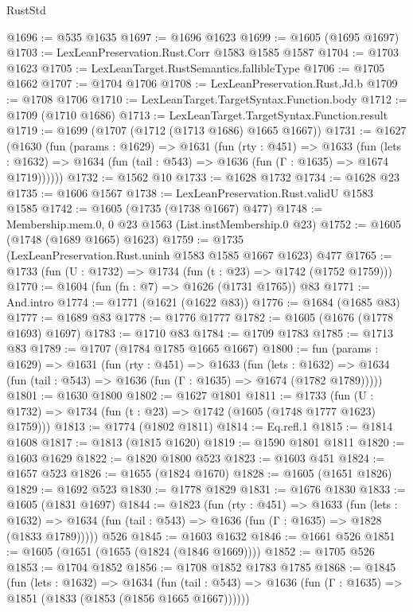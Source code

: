 \begin{lexlean}{RustStd}
\begin{coremodule}
@1696 := @535 @1635
@1697 := @1696 @1623
@1699 := @1605 (@1695 @1697)
@1703 := LexLeanPreservation.Rust.Corr @1583 @1585 @1587
@1704 := @1703 @1623
@1705 := LexLeanTarget.RustSemantics.fallibleType
@1706 := @1705 @1662
@1707 := @1704 @1706
@1708 := LexLeanPreservation.Rust.Jd.b
@1709 := @1708 @1706
@1710 := LexLeanTarget.TargetSyntax.Function.body
@1712 := @1709 (@1710 @1686)
@1713 := LexLeanTarget.TargetSyntax.Function.result
@1719 := @1699 (@1707 (@1712 (@1713 @1686) @1665 @1667))
@1731 := @1627
    (@1630
      (fun (params : @1629) =>
      @1631
        (fun (rty : @451) =>
        @1633
          (fun (lets : @1632) =>
          @1634 (fun (tail : @543) => @1636 (fun (Γ : @1635) => @1674 @1719))))))
@1732 := @1562 @10
@1733 := @1628 @1732
@1734 := @1628 @23
@1735 := @1606 @1567
@1738 := LexLeanPreservation.Rust.validU @1583 @1585
@1742 := @1605 (@1735 (@1738 @1667) @477)
@1748 := Membership.mem.{0, 0} @23 @1563 (List.instMembership.{0} @23)
@1752 := @1605 (@1748 (@1689 @1665) @1623)
@1759 := @1735 (LexLeanPreservation.Rust.uninh @1583 @1585 @1667 @1623) @477
@1765 := @1733 (fun (U : @1732) => @1734 (fun (t : @23) => @1742 (@1752 @1759)))
@1770 := @1604 (fun (fn : @7) => @1626 (@1731 @1765)) @83
@1771 := And.intro
@1774 := @1771 (@1621 (@1622 @83))
@1776 := @1684 (@1685 @83)
@1777 := @1689 @83
@1778 := @1776 @1777
@1782 := @1605 (@1676 (@1778 @1693) @1697)
@1783 := @1710 @83
@1784 := @1709 @1783
@1785 := @1713 @83
@1789 := @1707 (@1784 @1785 @1665 @1667)
@1800 := fun (params : @1629) =>
  @1631
    (fun (rty : @451) =>
    @1633
      (fun (lets : @1632) =>
      @1634 (fun (tail : @543) => @1636 (fun (Γ : @1635) => @1674 (@1782 @1789)))))
@1801 := @1630 @1800
@1802 := @1627 @1801
@1811 := @1733 (fun (U : @1732) => @1734 (fun (t : @23) => @1742 (@1605 (@1748 @1777 @1623) @1759)))
@1813 := @1774 (@1802 @1811)
@1814 := Eq.refl.{1}
@1815 := @1814 @1608
@1817 := @1813 (@1815 @1620)
@1819 := @1590 @1801 @1811
@1820 := @1603 @1629
@1822 := @1820 @1800 @523
@1823 := @1603 @451
@1824 := @1657 @523
@1826 := @1655 (@1824 @1670)
@1828 := @1605 (@1651 @1826)
@1829 := @1692 @523
@1830 := @1778 @1829
@1831 := @1676 @1830
@1833 := @1605 (@1831 @1697)
@1844 := @1823
    (fun (rty : @451) =>
    @1633
      (fun (lets : @1632) =>
      @1634 (fun (tail : @543) => @1636 (fun (Γ : @1635) => @1828 (@1833 @1789)))))
    @526
@1845 := @1603 @1632
@1846 := @1661 @526
@1851 := @1605 (@1651 (@1655 (@1824 (@1846 @1669))))
@1852 := @1705 @526
@1853 := @1704 @1852
@1856 := @1708 @1852 @1783 @1785
@1868 := @1845
    (fun (lets : @1632) =>
    @1634
      (fun (tail : @543) => @1636 (fun (Γ : @1635) => @1851 (@1833 (@1853 (@1856 @1665 @1667))))))

\end{coremodule}
\end{lexlean}
